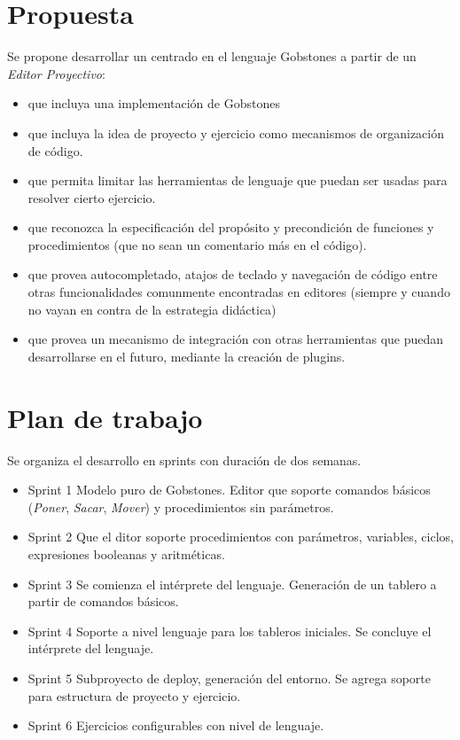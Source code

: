 \section{Propuesta}

Se propone desarrollar un \ile centrado en el lenguaje Gobstones a partir de un \textit{Editor Proyectivo}:

\begin{itemize}
  \item que incluya una implementación de Gobstones
  \item que incluya la idea de proyecto y ejercicio como mecanismos de organización de código.
  \item que permita limitar las herramientas de lenguaje que puedan ser usadas para resolver cierto ejercicio.
  \item que reconozca la especificación del propósito y precondición de funciones y procedimientos (que no sean un comentario más en el código).
  \item que provea autocompletado, atajos de teclado y navegación de código entre otras funcionalidades comunmente encontradas en editores (siempre y cuando no vayan en contra de la estrategia didáctica)
  \item que provea un mecanismo de integración con otras herramientas que puedan desarrollarse en el futuro, mediante la creación de plugins.
\end{itemize}


\section{Plan de trabajo}

Se organiza el desarrollo en sprints con duración de dos semanas.

\begin{itemize}
  \item{Sprint 1} Modelo puro de Gobstones. Editor que soporte comandos básicos (\textit{Poner}, \textit{Sacar}, \textit{Mover}) y procedimientos sin parámetros.
  \item{Sprint 2} Que el ditor soporte procedimientos con parámetros, variables, ciclos, expresiones booleanas y aritméticas.
  \item{Sprint 3} Se comienza el intérprete del lenguaje. Generación de un tablero a partir de comandos básicos.
  \item{Sprint 4} Soporte a nivel lenguaje para los tableros iniciales. Se concluye el intérprete del lenguaje. 
  \item{Sprint 5} Subproyecto de deploy, generación del entorno. Se agrega soporte para estructura de proyecto y ejercicio.
  \item{Sprint 6} Ejercicios configurables con nivel de lenguaje.
\end{itemize} 


